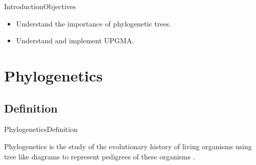 \documentclass[10pt]{beamer}
\newcommand{\1}{
	\setbeamertemplate{background}{
		\texttt{[image: img/1]}
		\tikz[overlay] \fill[fill opacity=0.75,fill=white] (0,0) rectangle (-\paperwidth,\paperheight);
	}
}
\begin{document}
\begin{frame}{Introduction}{Objectives}
\begin{itemize}
    \item<1-> Understand the importance of phylogenetic trees. 
    \item<2-> Understand and implement UPGMA.
  \end{itemize}
\end{frame}


\section{Phylogenetics}

\subsection{Definition}

\begin{frame}{Phylogenetics}{Definition}
	\begin{block}{}
		Phylogenetics is the study of the evolutionary history of living organisms using tree like diagrams to represent pedigrees of these organisms \cite{xiong2006essential}. 		
	\end{block}
\end{frame}
\end{document}
